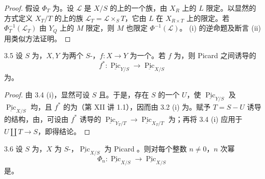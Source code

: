 \begin{proof}
假设 $\Phi_T$ 为。设 $\mathscr L$ 是 $X/S$ 的上的一个族，由 $X_R$ 上的 $L$ 限定。以显然的方式定义 $X_T/T$ 的上的族 $\mathscr L_T=\mathscr L\times_ST$，它由 $L$ 在 $X_{R\times T}$ 上的限定。若 $\Phi_T^{-1}(\mathscr L_T)$ 由 $Y_Q$ 上的 $M$ 限定，则 $M$ 也限定 $\Phi^{-1}(\mathscr L)$。
(i) 的逆命题及断言 (ii) 用类似方法证明。
\end{proof}
\begin{SGAresult}{}{3.5}
设 $S$ 为，$X,Y$ 为两个 $S$-，$f:X\to Y$ 为一个。若 $f$ 为，则 Picard 之间诱导的
\[f^*:\underline{\operatorname{Pic}}_{Y/S}\longrightarrow\underline{\operatorname{Pic}}_{X/S}\]
为。
\end{SGAresult}
\begin{proof}
由 3.4 (i)，显然可设 $S$ 且。于是，存在 $S$ 的一个 $U$，使 $\underline{\operatorname{Pic}}_{Y/S}$ 及 $\underline{\operatorname{Pic}}_{X/S}$ 均，且 $f^*$ 的为（第 XII 讲 1.1），因而由 3.2 (i) 为。赋予 $T=S-U$ 诱导的结构，由，可设由 $f^*$ 诱导的 $\underline{\operatorname{Pic}}_{Y_T/T}\to\underline{\operatorname{Pic}}_{X_T/T}$ 为；再将 3.4 (i) 应用于 $U\amalg T\to S$，即得结论。
\end{proof}
\begin{SGAresult}{}{3.6}
设 $S$ 为，$X$ 为 $S$-，$\underline{\operatorname{Pic}}_{X/S}$ 为 Picard 。则对每个整数 $n\neq0$，$n$ 次幂
\[\Phi_n:\underline{\operatorname{Pic}}_{X/S}\longrightarrow\underline{\operatorname{Pic}}_{X/S}\]
是。
\end{SGAresult}
